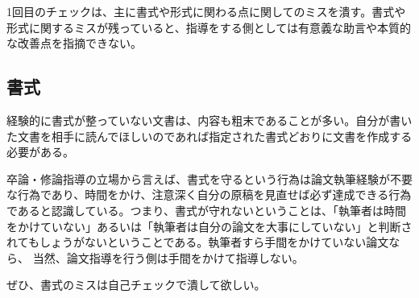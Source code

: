 \documentclass[11pt,a4j]{jsarticle}
\begin{document}
1回目のチェックは、主に書式や形式に関わる点に関してのミスを潰す。書式や
形式に関するミスが残っていると、指導をする側としては有意義な助言や本質的
な改善点を指摘できない。


\subsection{書式}

経験的に書式が整っていない文書は、内容も粗末であることが多い。自分が書い
た文書を相手に読んでほしいのであれば指定された書式どおりに文書を作成する
必要がある。

卒論・修論指導の立場から言えば、書式を守るという行為は論文執筆経験が不要
な行為であり、時間をかけ、注意深く自分の原稿を見直せば必ず達成できる行為
であると認識している。つまり、書式が守れないということは、「執筆者は時間
をかけていない」あるいは「執筆者は自分の論文を大事にしていない」と判断さ
れてもしょうがないということである。執筆者すら手間をかけていない論文なら、
当然、論文指導を行う側は手間をかけて指導しない。

ぜひ、書式のミスは自己チェックで潰して欲しい。
\end{document}
